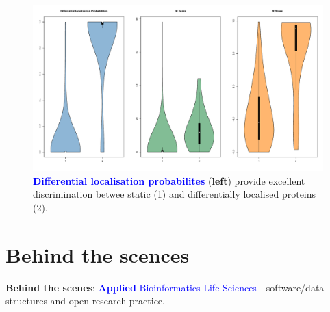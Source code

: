 \documentclass{beamer}
\theoremstyle{example}
\begin{document}
\begin{frame}
  \begin{figure}[h]
    \centering
    \includegraphics[width=\linewidth]{./figs/vioplotInformative.pdf}
    \caption{\textbf{\textcolor{Blue}{Differential localisation
          probabilites}} (\textbf{left}) provide excellent
      discrimination betwee static (1) and differentially localised
      proteins (2).}
  \end{figure}
\end{frame}



\section{Behind the scences}


\begin{frame}{}
  \begin{center}
    \Large{\textbf{Behind the scenes}:
      \textcolor{Blue}{\textbf{Applied} Bioinformatics Life Sciences}
      - software/data structures and open research practice.}
  \end{center}
\end{frame}
\end{document}
